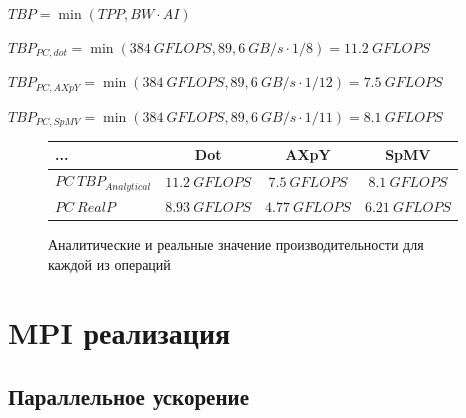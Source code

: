 \documentclass[12pt, a4paper]{article}
\begin{document}
$ TBP = \min(TPP, BW \cdot AI)  $

$ TBP_{PC, dot} = \min(384\ GFLOPS, 89,6\ GB/s \cdot 1/8) = 11.2\ GFLOPS $

$ TBP_{PC, AXpY} = \min(384\ GFLOPS, 89,6\ GB/s \cdot 1/12) = 7.5\ GFLOPS $

$ TBP_{PC, SpMV} = \min(384\ GFLOPS, 89,6\ GB/s \cdot 1/11) = 8.1\ GFLOPS $




\begin{figure}[h!]
	\center
	\setlength{\tabcolsep}{10pt}
	\renewcommand{\arraystretch}{1.5}
	\begin{tabular}{|l|c|c|c|}
		\hline
		... & Dot & AXpY & SpMV \\
		\hline
		$PC\ TBP_{Analytical} $ & $ 11.2\ GFLOPS $ & $ 7.5\ GFLOPS $ & $ 8.1\ GFLOPS $ \\
		\hline
		$PC\ RealP $ & $ 8.93\ GFLOPS $ & $ 4.77\ GFLOPS $ & $ 6.21\ GFLOPS $ \\
		\hline
	\end{tabular}
	\caption{Аналитические и реальные значение производительности для каждой из операций}
	\label{fig:tbps}
\end{figure}

\section{MPI реализация}

\subsection{Параллельное ускорение}
\end{document}

